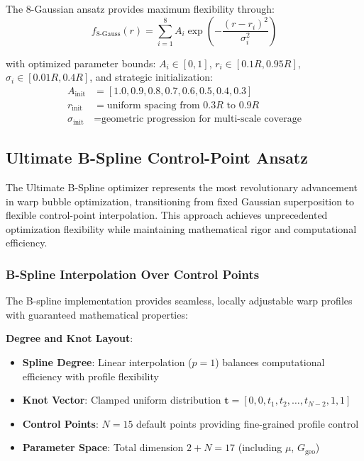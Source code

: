 \documentclass[12pt,a4paper]{article}
\begin{document}
The 8-Gaussian ansatz provides maximum flexibility through:
\begin{equation}
f_{8\text{-Gauss}}(r) = \sum_{i=1}^{8} A_i \exp\left(-\frac{(r - r_i)^2}{\sigma_i^2}\right)
\end{equation}

with optimized parameter bounds: $A_i \in [0,1]$, $r_i \in [0.1R, 0.95R]$, $\sigma_i \in [0.01R, 0.4R]$, and strategic initialization:
\begin{align}
A_{\text{init}} &= [1.0, 0.9, 0.8, 0.7, 0.6, 0.5, 0.4, 0.3] \\
r_{\text{init}} &= \text{uniform spacing from } 0.3R \text{ to } 0.9R \\
\sigma_{\text{init}} &= \text{geometric progression for multi-scale coverage}
\end{align}

\subsection{Ultimate B-Spline Control-Point Ansatz}
\label{sec:ultimate_bspline_ansatz}

The Ultimate B-Spline optimizer represents the most revolutionary advancement in warp bubble optimization, transitioning from fixed Gaussian superposition to flexible control-point interpolation. This approach achieves unprecedented optimization flexibility while maintaining mathematical rigor and computational efficiency.

\subsubsection{B-Spline Interpolation Over Control Points}

The B-spline implementation provides seamless, locally adjustable warp profiles with guaranteed mathematical properties:

\textbf{Degree and Knot Layout}:
\begin{itemize}
\item \textbf{Spline Degree}: Linear interpolation ($p = 1$) balances computational efficiency with profile flexibility
\item \textbf{Knot Vector}: Clamped uniform distribution $\mathbf{t} = [0, 0, t_1, t_2, \ldots, t_{N-2}, 1, 1]$
\item \textbf{Control Points}: $N = 15$ default points providing fine-grained profile control
\item \textbf{Parameter Space}: Total dimension $2 + N = 17$ (including $\mu$, $G_{\text{geo}}$)
\end{itemize}
\end{document}
